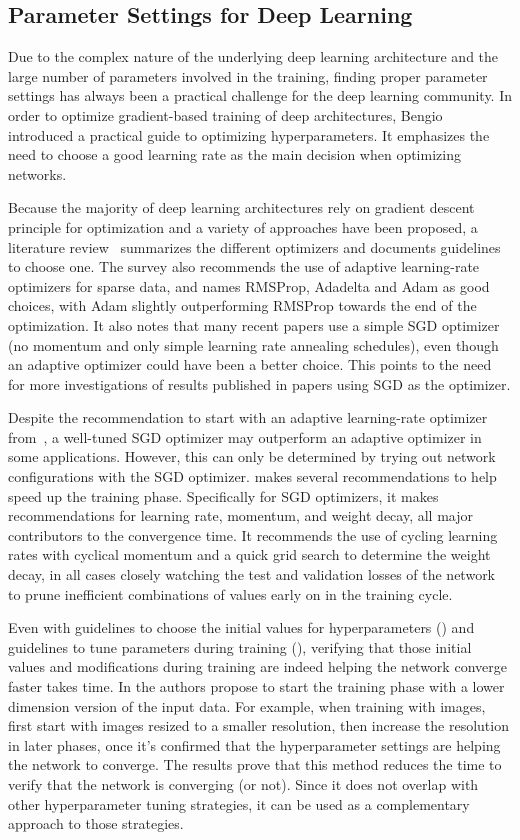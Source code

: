 \documentclass[../dropout-vs-batch-normalization.tex]{subfiles}
\begin{document}
\subsection{Parameter Settings for Deep Learning}
Due to the complex nature of the underlying deep learning architecture and the large number of parameters involved in the training, finding proper parameter settings has always been a practical challenge for the deep learning community. In order to optimize gradient-based training of deep architectures, Bengio~\cite{Bengio2012} introduced a practical guide to optimizing hyperparameters. It emphasizes the need to choose a good learning rate as the main decision when optimizing networks.

Because the majority of deep learning architectures rely on gradient descent principle for optimization and a variety of approaches have been proposed, a literature review~\cite{Ruder2016} summarizes the different optimizers and documents guidelines to choose one. The survey also recommends the use of adaptive learning-rate optimizers for sparse data, and names RMSProp, Adadelta and Adam as good choices, with Adam slightly outperforming RMSProp towards the end of the optimization. It also notes that many recent papers use a simple SGD optimizer (no momentum and only simple learning rate annealing schedules), even though an adaptive optimizer could have been a better choice. This points to the need for more investigations of results published in papers using SGD as the optimizer.

Despite the recommendation to start with an adaptive learning-rate optimizer from~\cite{Ruder2016}, a well-tuned SGD optimizer may outperform an adaptive optimizer in some applications. However, this can only be determined by trying out network configurations with the SGD optimizer. \cite{Smith2018} makes several recommendations to help speed up the training phase. Specifically for SGD optimizers, it makes recommendations for learning rate, momentum, and weight decay, all major contributors to the convergence time. It recommends the use of cycling learning rates with cyclical momentum and a quick grid search to determine the weight decay, in all cases closely watching the test and validation losses of the network to prune inefficient combinations of values early on in the training cycle. 

Even with guidelines to choose the initial values for hyperparameters (\cite{Bengio2012}) and guidelines to tune parameters during training (\cite{Smith2018}), verifying that those initial values and modifications during training are indeed helping the network converge faster takes time. In \cite{Hinz2018} the authors propose to start the training phase with a lower dimension version of the input data. For example, when training with images, first start with images resized to a smaller resolution, then increase the resolution in later phases, once it's confirmed that the hyperparameter settings are helping the network to converge. The results prove that this method reduces the time to verify that the network is converging (or not). Since it does not overlap with other hyperparameter tuning strategies, it can be used as a complementary approach to those strategies.
\end{document}
